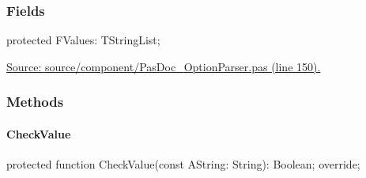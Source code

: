 \documentclass{report}
\newif\ifpdf
\begin{document}
\subsubsection*{\large{\textbf{Fields}}\normalsize\hspace{1ex}\hfill}
\begin{list}{}{
\setlength{\itemindent}{0cm}
\setlength{\listparindent}{0cm}
\setlength{\leftmargin}{\evensidemargin}
\addtolength{\leftmargin}{\tmplength}
\settowidth{\labelsep}{X}
\addtolength{\leftmargin}{\labelsep}
\setlength{\labelwidth}{\tmplength}
}
\label{PasDoc_OptionParser.TStringOptionList-FValues}
\item[\textbf{FValues}\hfill]
\ifpdf
\begin{flushleft}
\fi
\begin{ttfamily}
protected FValues: TStringList;\end{ttfamily}

\ifpdf
\end{flushleft}
\fi


\par  \par
\href{https://github.com/pasdoc/pasdoc/blob/master/source/component/PasDoc_OptionParser.pas#L150}{Source: source/component/PasDoc{\_}OptionParser.pas (line 150).}\end{list}
\subsubsection*{\large{\textbf{Methods}}\normalsize\hspace{1ex}\hfill}
\paragraph*{CheckValue}\hspace*{\fill}

\label{PasDoc_OptionParser.TStringOptionList-CheckValue}
\begin{list}{}{
\setlength{\itemindent}{0cm}
\setlength{\listparindent}{0cm}
\setlength{\leftmargin}{\evensidemargin}
\addtolength{\leftmargin}{\tmplength}
\settowidth{\labelsep}{X}
\addtolength{\leftmargin}{\labelsep}
\setlength{\labelwidth}{\tmplength}
}
\item[\textbf{Declaration}\hfill]
\ifpdf
\begin{flushleft}
\fi
\begin{ttfamily}
protected function CheckValue(const AString: String): Boolean; override;\end{ttfamily}

\ifpdf
\end{flushleft}
\fi

\end{list}
\end{document}
